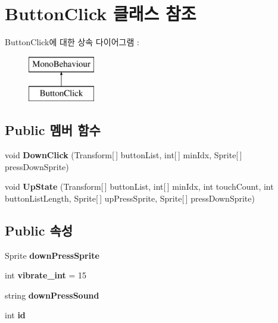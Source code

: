 \hypertarget{class_button_click}{}\section{Button\+Click 클래스 참조}
\label{class_button_click}
Button\+Click에 대한 상속 다이어그램 \+: \begin{figure}[H]
\begin{center}
\leavevmode
\includegraphics[height=2.000000cm]{class_button_click}
\end{center}
\end{figure}
\subsection*{Public 멤버 함수}
\begin{DoxyCompactItemize}
\item 
\hypertarget{class_button_click_a21c93193c78ed70fc3bca4d7dbccce2d}{}void {\bfseries Down\+Click} (Transform\mbox{[}$\,$\mbox{]} button\+List, int\mbox{[}$\,$\mbox{]} min\+Idx, Sprite\mbox{[}$\,$\mbox{]} press\+Down\+Sprite)\label{class_button_click_a21c93193c78ed70fc3bca4d7dbccce2d}

\item 
\hypertarget{class_button_click_a5743d5a6de59772fc270c5b1631198d2}{}void {\bfseries Up\+State} (Transform\mbox{[}$\,$\mbox{]} button\+List, int\mbox{[}$\,$\mbox{]} min\+Idx, int touch\+Count, int button\+List\+Length, Sprite\mbox{[}$\,$\mbox{]} up\+Press\+Sprite, Sprite\mbox{[}$\,$\mbox{]} press\+Down\+Sprite)\label{class_button_click_a5743d5a6de59772fc270c5b1631198d2}

\end{DoxyCompactItemize}
\subsection*{Public 속성}
\begin{DoxyCompactItemize}
\item 
\hypertarget{class_button_click_a48a07b5034b25eef2a7baf6d205ee5a5}{}Sprite {\bfseries down\+Press\+Sprite}\label{class_button_click_a48a07b5034b25eef2a7baf6d205ee5a5}

\item 
\hypertarget{class_button_click_a67d83145735e80e3d861824de03c4316}{}int {\bfseries vibrate\+\_\+int} = 15\label{class_button_click_a67d83145735e80e3d861824de03c4316}

\item 
\hypertarget{class_button_click_aafe0162741cd71c14b72ebe03fe0497e}{}string {\bfseries down\+Press\+Sound}\label{class_button_click_aafe0162741cd71c14b72ebe03fe0497e}

\item 
\hypertarget{class_button_click_a688591097ac528d9d5b8fd70e98689bd}{}int {\bfseries id}\label{class_button_click_a688591097ac528d9d5b8fd70e98689bd}

\end{DoxyCompactItemize}


